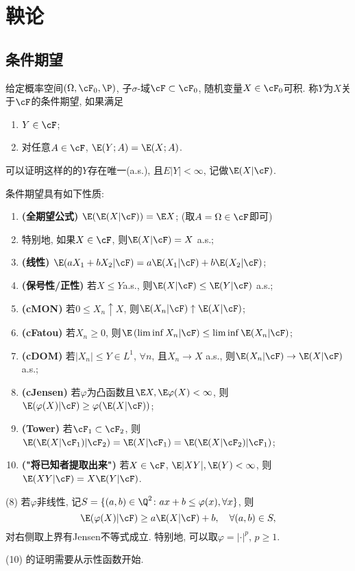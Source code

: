 \documentclass[a4paper, 10pt]{ctexart}
\begin{document}
\newpage
\section{鞅论}
\subsection{条件期望}

给定概率空间$(\Omega, \cF_0, \P)$, 子$\sigma$-域$\cF \subset \cF_0$, 随机变量$X \in \cF_0$可积. 
称$Y$为$X$关于$\cF$的条件期望, 如果满足
\begin{enumerate}
	\item $Y \in \cF$; 
	\item 对任意$A \in \cF$, $\E(Y;A) = \E(X;A)$. 
\end{enumerate}
可以证明这样的的$Y$存在唯一(a.s.), 且$E|Y| < \infty$, 记做$\E(X|\cF)$. 

\begin{theorem}[条件期望的性质]
	条件期望具有如下性质: 
	\begin{enumerate}[label=(\arabic*)]
		\item \textbf{(全期望公式)} $\E(\E(X|\cF)) = \E X$; (取$A = \Omega \in \cF$即可)
		\item 特别地, 如果$X \in \cF$, 则$\E(X|\cF) = X$ a.s.;
		\item \textbf{(线性)} $\E(aX_1+bX_2 | \cF) = a \E(X_1|\cF) + b\E(X_2|\cF)$; 
		\item \textbf{(保号性/正性)} 若$X \leq Y$a.s., 则$\E(X|\cF) \leq \E(Y|\cF)$ a.s.;
		\item \textbf{(cMON)} 若$0 \leq X_n \uparrow X$, 则$\E(X_n|\cF) \uparrow \E(X|\cF)$; 
		\item \textbf{(cFatou)} 若$X_n \geq 0$, 则$\E\left( \liminf X_n | \cF \right) \leq \liminf \E(X_n | \cF)$; 
		\item \textbf{(cDOM)} 若$|X_n| \leq Y \in L^1$, $\forall n$, 且$X_n \to X$ a.s.,  则$\E(X_n|\cF) \to \E(X|\cF)$ a.s.; 
		\item \textbf{(cJensen)} 若$\varphi$为凸函数且$\E X, \E \varphi(X) < \infty$, 则$\E(\varphi(X) | \cF) \geq \varphi(\E(X|\cF))$; 
		\item \textbf{(Tower)} 若$\cF_1 \subset \cF_2$, 则$\E(\E(X|\cF_1)|\cF_2) = \E(X|\cF_1) = \E(\E(X|\cF_2)|\cF_1)$; 
		\item \textbf{("将已知者提取出来")} 若$X \in \cF$, $\E|XY|, \E(Y) < \infty$, 则$\E(XY|\cF) = X \E(Y|\cF)$. 
	\end{enumerate}
\end{theorem}
\begin{remark}
	(8) 若$\varphi$非线性, 记$S= \{(a,b) \in \Q^2 \colon a x+ b \leq \varphi(x), \forall x\}$, 则
	\begin{equation*}
		\E(\varphi(X)|\cF) \geq a \E(X|\cF) + b, \quad \forall (a,b) \in S, 
	\end{equation*}
	对右侧取上界有Jensen不等式成立. 
	特别地, 可以取$\varphi = |\cdot|^p$, $p \geq 1$. 
	
	(10) 的证明需要从示性函数开始. 
\end{remark}
\end{document}
